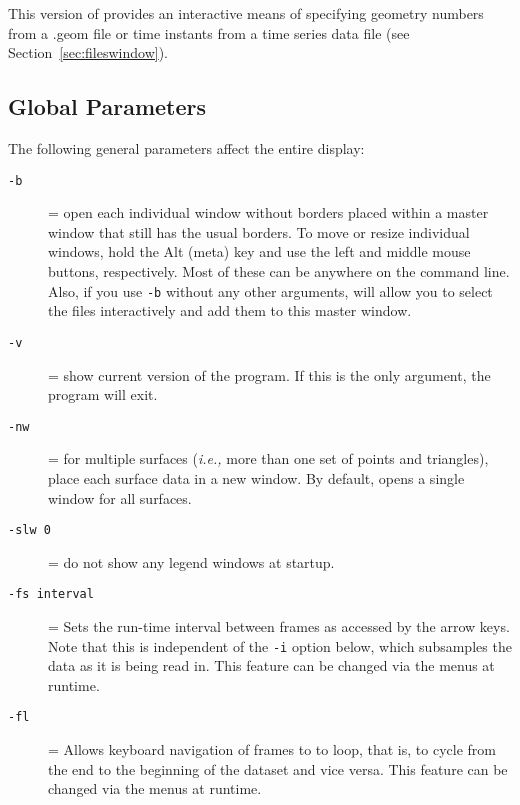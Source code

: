 This version of \map{} provides an interactive means of 
specifying geometry numbers from a .geom file or time instants from a 
time series data file (see Section~\ref{sec:fileswindow}).

\subsection{Global Parameters}
\label{sec:usage-global} 

\noindent
The following general parameters affect the entire display:
\begin{description}
    
  \item[{\tt -b }] = open each individual window without borders
    placed within a master window that still has the usual borders.  To
    move or resize individual windows, hold the Alt (meta) key and use the left
    and middle mouse buttons, respectively.  Most of these can be anywhere on
    the command line.  Also, if you use {\tt -b} without any other arguments,
    \map{} will allow you to select the files interactively and add them to
    this master window.
    
    
  \item [{\tt -v}] = show current version of the program.  If this is
    the only argument, the program will exit.
    
        
  \item[{\tt -nw}] = for multiple surfaces ({\em i.e.,} more than one
    set of points and triangles), place each surface data in a new
    window. By default, \map{} opens a single window for all
    surfaces.
    
  \item[{\tt -slw 0}] = do not show any legend windows at startup.

  \item[{\tt -fs interval}] = Sets the run-time interval between frames
    as accessed by the arrow keys.  Note that this is independent of the 
    {\tt -i} option below, which subsamples the data as it is being read in.
    This feature can be changed via the menus at runtime.
    
  \item[{\tt -fl}] = Allows keyboard navigation of frames to to loop,
    that is, to cycle from the end to the beginning of the dataset and 
    vice versa.
    This feature can be changed via the menus at runtime.
    

\end{description}
